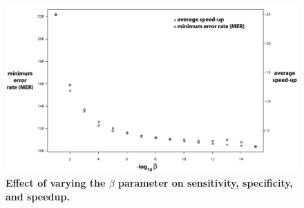 \begin{figure}
\begin{center}
\includegraphics[width=6.4in]{figs/betavaried}
\caption{\textbf{Effect of varying the $\beta$ parameter on
    sensitivity, specificity, and speedup.}
}
\label{fig:betavaried}
\end{center}
\end{figure}
